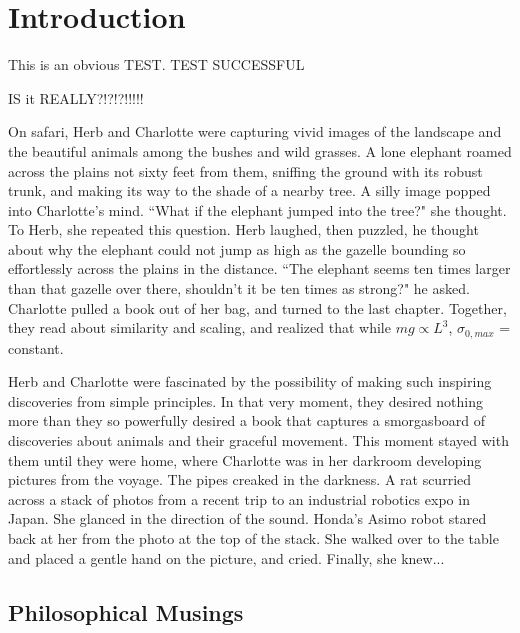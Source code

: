 \chapter{Introduction}
\label{sec:Introduction}

This is an obvious TEST. 
TEST SUCCESSFUL

IS it REALLY?!?!?!!!!!

On safari, Herb and Charlotte were capturing vivid images of the landscape and the beautiful animals among the bushes and wild grasses. A lone elephant roamed across the plains not sixty feet from them, sniffing the ground with its robust trunk, and making its way to the shade of a nearby tree. A silly image popped into Charlotte's mind. ``What if the elephant jumped into the tree?" she thought. To Herb, she repeated this question. Herb laughed, then puzzled, he thought about why the elephant could not jump as high as the gazelle bounding so effortlessly across the plains in the distance. ``The elephant seems ten times larger than that gazelle over there, shouldn't it be ten times as strong?" he asked. Charlotte pulled a book \cite{mcmahon84} out of her bag, and turned to the last chapter. Together, they read about similarity and scaling, and realized that while $mg \propto L^{3}$, $\sigma_{0, max}$ = constant.

Herb and Charlotte were fascinated by the possibility of making such inspiring discoveries from simple principles. In that very moment, they desired nothing more than they so powerfully desired a book that captures a smorgasboard of discoveries about animals and their graceful movement. This moment stayed with them until they were home, where Charlotte was in her darkroom developing pictures from the voyage. The pipes creaked in the darkness. A rat scurried across a stack of photos from a recent trip to an industrial robotics expo in Japan. She glanced in the direction of the sound. Honda's Asimo robot stared back at her from the photo at the top of the stack. She walked over to the table and placed a gentle hand on the picture, and cried. Finally, she knew...

\section{Philosophical Musings}

